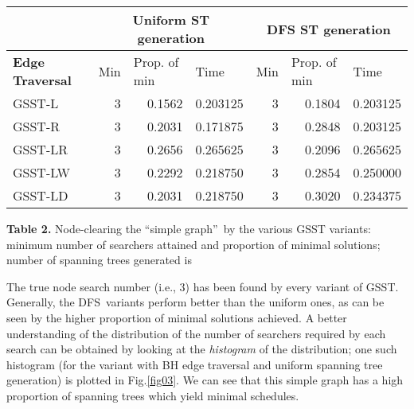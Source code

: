 \documentclass[11pt]{article}\usepackage{amsmath}
\begin{document}
\begin{center}\begin{tabular}
[c]{|l|l|l|l|l|l|l|}\hline
& \multicolumn{3}{|c}{\textbf{Uniform ST generation}} &
\multicolumn{3}{|c|}{\textbf{DFS ST generation}}\\\hline
\textbf{Edge Traversal} & Min & Prop. of min & Time & Min & Prop. of min &
Time\\\hline
GSST-L & \multicolumn{1}{|r|}{3} & \multicolumn{1}{|r|}{0.1562} &
\multicolumn{1}{|r|}{0.203125} & \multicolumn{1}{|r|}{3} &
\multicolumn{1}{|r|}{0.1804} & \multicolumn{1}{|r|}{0.203125}\\\hline
GSST-R & \multicolumn{1}{|r|}{3} & \multicolumn{1}{|r|}{0.2031} &
\multicolumn{1}{|r|}{0.171875} & \multicolumn{1}{|r|}{3} &
\multicolumn{1}{|r|}{0.2848} & \multicolumn{1}{|r|}{0.203125}\\\hline
GSST-LR & \multicolumn{1}{|r|}{3} & \multicolumn{1}{|r|}{0.2656} &
\multicolumn{1}{|r|}{0.265625} & \multicolumn{1}{|r|}{3} &
\multicolumn{1}{|r|}{0.2096} & \multicolumn{1}{|r|}{0.265625}\\\hline
GSST-LW & \multicolumn{1}{|r|}{3} & \multicolumn{1}{|r|}{0.2292} &
\multicolumn{1}{|r|}{0.218750} & \multicolumn{1}{|r|}{3} &
\multicolumn{1}{|r|}{0.2854} & \multicolumn{1}{|r|}{0.250000}\\\hline
GSST-LD & \multicolumn{1}{|r|}{3} & \multicolumn{1}{|r|}{0.2031} &
\multicolumn{1}{|r|}{0.218750} & \multicolumn{1}{|r|}{3} &
\multicolumn{1}{|r|}{0.3020} & \multicolumn{1}{|r|}{0.234375}\\\hline
\end{tabular}



\end{center}

\noindent\textbf{Table 2.} Node-clearing the \textquotedblleft simple
graph\textquotedblright\ by the various GSST variants: minimum number of
searchers attained and proportion of minimal solutions; number of spanning
trees generated is 

\bigskip

The true node search number (i.e., 3) has been found by every variant of GSST.
Generally, the DFS\ variants perform better than the uniform ones, as can be
seen by the higher proportion of minimal solutions achieved. A better
understanding of the distribution of the number of searchers required by each
search can be obtained by looking at the \emph{histogram} of the distribution;
one such histogram (for the variant with BH edge traversal and uniform
spanning tree generation) is plotted in Fig.\ref{fig03}. We can see that this
simple graph has a high proportion of spanning trees which yield minimal schedules.
\end{document}
